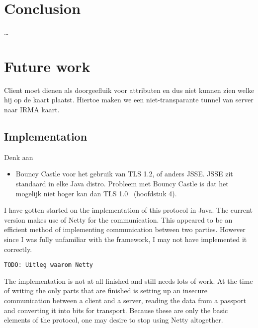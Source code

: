 \section{Conclusion}
\label{sec:conclusion}

\ldots

\section{Future work}
\label{sec:futurework}

Client moet dienen als doorgeefluik voor attributen en dus niet kunnen zien welke hij op de kaart plaatst. Hiertoe maken we een niet-transparante tunnel van server naar IRMA kaart.

\subsection{Implementation}
Denk aan
\begin{itemize}
	\item Bouncy Castle voor het gebruik van TLS 1.2, of anders JSSE. JSSE zit standaard in elke Java distro. Probleem met Bouncy Castle is dat het mogelijk niet hoger kan dan TLS 1.0~\cite{sslanalysis} (hoofdstuk 4). 
\end{itemize}

I have gotten started on the implementation of this protocol in Java. The current version makes use of Netty for the communication. This appeared to be an efficient method of implementing communication between two parties. However since I was fully unfamiliar with the framework, I may not have implemented it correctly.

\texttt{TODO: Uitleg waarom Netty}

The implementation is not at all finished and still needs lots of work. At the time of writing the only parts that are finished is setting up an insecure communication between a client and a server, reading the data from a passport and converting it into bits for transport. Because these are only the basic elements of the protocol, one may desire to stop using Netty altogether.
